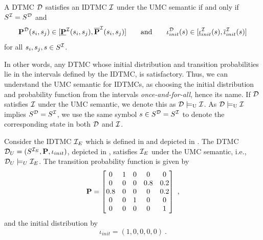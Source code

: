 \begin{definition}\label{def:once-and-for-all_semantic}
    A DTMC $\mathcal{D}$ satisfies an IDTMC $\mathcal{I}$ under the UMC semantic if and only if $S^{\mathcal{I}} = S^{\mathcal{D}}$ and
    \[\mathbf{P}^{\mathcal{D}}(s_i,s_j)\in[\mathbf{\underline{P}}^{\mathcal{I}}(s_i,s_j),\mathbf{\overline{P}}^{\mathcal{I}}(s_i,s_j)] \qquad \text{and} \qquad \iota_{init}^{\mathcal{D}}(s)\in[\mathbf{\underline{\iota}}_{init}^{\mathcal{I}}(s),\mathbf{\overline{\iota}}_{init}^{\mathcal{I}}(s)]\]
    for all $s_i,s_j,s\in S^{\mathcal{I}}$.
\end{definition}
In other words, any DTMC whose initial distribution and transition probabilities lie in the intervals defined by the IDTMC, is satisfactory. Thus, we can understand the UMC semantic for IDTMCs, as choosing the initial distribution and probability function from the intervals \textit{once-and-for-all}, hence its name.
If $\mathcal{D}$ satisfies $\mathcal{I}$ under the UMC semantic, we denote this as $\mathcal{D}\models_{\text{U}}\mathcal{I}$.
As $\mathcal{D}\models_{\mathrm{U}}\mathcal{I}$ implies $S^{\mathcal{D}}=S^{\mathcal{I}}$, we use the same symbol $s\in S^{\mathcal{D}}=S^{\mathcal{I}}$ to denote the corresponding state in both $\mathcal{D}$ and $\mathcal{I}$.

\begin{example}\label{ex:UMC_semantic_figure}
    Consider the IDTMC $\mathcal{I}_E$ which is defined in  and depicted in . The DTMC $\mathcal{D}_U = (S^{\mathcal{I}_E},\mathbf{P},\iota_{init})$, depicted in , satisfies $\mathcal{I}_E$ under the UMC semantic, i.e., $\mathcal{D}_U \models_U \mathcal{I}_E$. The transition probability function is given by
    \[
        \mathbf{P} = \begin{bmatrix}
            0 & 1 & 0 & 0 & 0 \\
            0 & 0 & 0 & 0.8 & 0.2 \\
            0.8 & 0 & 0 & 0 & 0.2 \\
            0 & 0 & 1 & 0 & 0 \\
            0 & 0 & 0 & 0 & 1
        \end{bmatrix}\ ,
    \]
    and the initial distribution by
    \[\iota_{init} = (1,0,0,0,0)\ .\]
\end{example}

